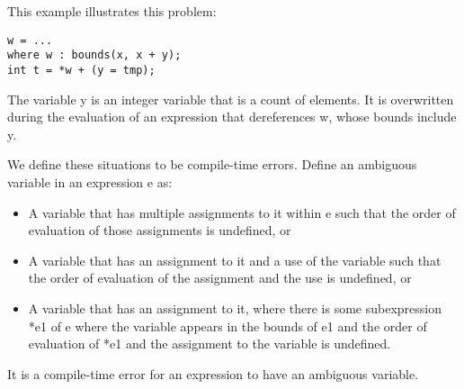 This example illustrates this problem:

\begin{verbatim}
w = ...
where w : bounds(x, x + y);
int t = *w + (y = tmp);
\end{verbatim}

The variable y is an integer variable that is a count of elements. It is
overwritten during the evaluation of an expression that dereferences w,
whose bounds include y.

We define these situations to be compile-time errors. Define an
ambiguous variable in an expression e as:

\begin{itemize}
\item
  A variable that has multiple assignments to it within e such that the
  order of evaluation of those assignments is undefined, or
\item
  A variable that has an assignment to it and a use of the variable such
  that the order of evaluation of the assignment and the use is
  undefined, or
\item
  A variable that has an assignment to it, where there is some
  subexpression *e1 of e where the variable appears in the bounds of e1
  and the order of evaluation of *e1 and the assignment to the variable
  is undefined.
\end{itemize}

It is a compile-time error for an expression to have an ambiguous
variable.
